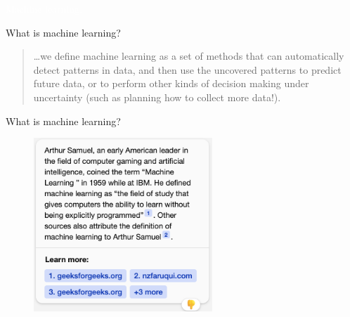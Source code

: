 \documentclass[xcolor={dvipsnames}, handout]{beamer}
\begin{document}

\begin{transitionframe}
\centering

\LARGE \textcolor{white}{Machine learning.}

\end{transitionframe}
\begin{frame}{What is machine learning?}

\begin{quote}
  \dots we define machine learning as a set of methods that can \textcolor{Contrast2}{automatically detect patterns in data}, and then use the uncovered patterns to \textcolor{Contrast2}{predict future data}, or to perform \textcolor{Contrast2}{other kinds of decision making under uncertainty} (such as planning how to collect more data!).
\end{quote}

\hfill \cite{murphy2012machine}

\end{frame}



\begin{frame}{What is machine learning?}

\begin{figure}
\centering
\includegraphics[width = 0.6\textwidth]{../assets/arthur-samuel-according-to-bing.png}
\end{figure}

\end{frame}
\end{document}

